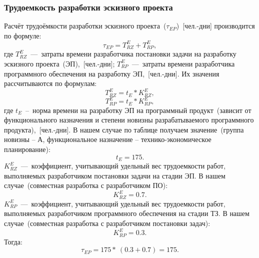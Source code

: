         \subsubsection{Трудоемкость разработки эскизного проекта}
            Расчёт трудоёмкости разработки эскизного проекта~($\tau_{EP}$)~[чел.-дни] производится по формуле:
            $$\tau_{EP} = T^E_{RZ} + T^E_{RP},$$
            где $T^E_{RZ}$~---~затраты времени разработчика постановки задачи на разработку эскизного проекта~(ЭП),~[чел.-дни];
            $T^E_{RP}$~---~затраты времени разработчика программного обеспечения на разработку ЭП,~[чел.-дни].
            Их значения рассчитываются по формулам:
            $$T^E_{RZ} = t_E * K^E_{RZ},$$
            $$T^E_{RP} = t_E * K^E_{RP},$$
            где $t_E$~--~норма времени на разработку ЭП на программный продукт~(зависит от функционального назначения и степени новизны разрабатываемого программного продукта),~[чел.-дни].
            В нашем случае по таблице получаем значение~(группа новизны – А, функциональное назначение – технико-экономическое планирование):
            $$t_E = 175.$$
            $K^E_{RZ}$~---~коэффициент, учитывающий удельный вес трудоемкости работ, выполняемых разработчиком постановки задачи на стадии ЭП.
            В нашем случае~(совместная разработка с разработчиком ПО):
            $$K^E_{RZ} = 0.7.$$
            $K^E_{RP}$~---~коэффициент, учитывающий удельный вес трудоемкости работ, выполняемых разработчиком программного обеспечения на стадии ТЗ.
            В нашем случае~(совместная разработка с разработчиком постановки задач):
            $$K^E_{RP} = 0.3.$$
            Тогда:
            $$\tau_{EP} = 175 *~(0.3 + 0.7) = 175.$$

